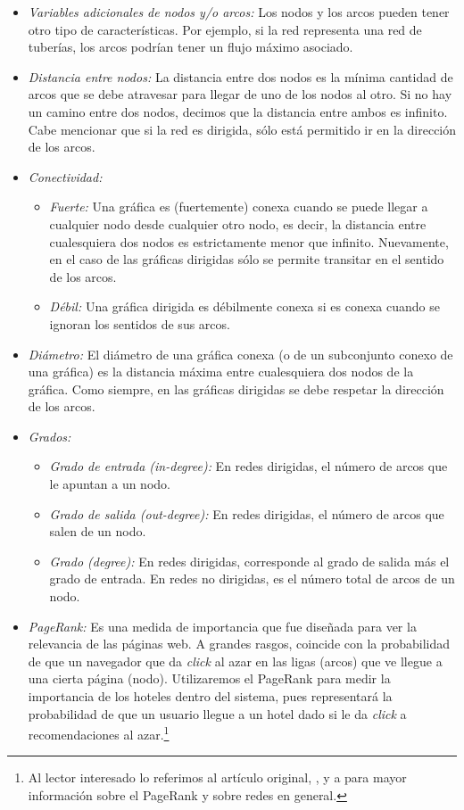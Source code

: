 \documentclass[12pt]{report}
\begin{document}
\begin{itemize}
	\item \emph{Variables adicionales de nodos y/o arcos:} Los nodos y los arcos pueden tener otro tipo de características. Por ejemplo, si la red representa una red de tuberías, los arcos podrían tener un flujo máximo asociado.
	\item \emph{Distancia entre nodos:} La distancia entre dos nodos es la mínima cantidad de arcos que se debe atravesar para llegar de uno de los nodos al otro. Si no hay un camino entre dos nodos, decimos que la distancia entre ambos es infinito. Cabe mencionar que si la red es dirigida, sólo está permitido ir en la dirección de los arcos.
	\item \emph{Conectividad:}
	\begin{itemize}
		\item \emph{Fuerte:} Una gráfica es (fuertemente) conexa cuando se puede llegar a cualquier nodo desde cualquier otro nodo, es decir, la distancia entre cualesquiera dos nodos es estrictamente menor que infinito. Nuevamente, en el caso de las gráficas dirigidas sólo se permite transitar en el sentido de los arcos.
		\item \emph{Débil:} Una gráfica dirigida es débilmente conexa si es conexa cuando se ignoran los sentidos de sus arcos.
	\end{itemize}
	\item \emph{Diámetro:} El diámetro de una gráfica conexa (o de un subconjunto conexo de una gráfica) es la distancia máxima entre cualesquiera dos nodos de la gráfica. Como siempre, en las gráficas dirigidas se debe respetar la dirección de los arcos.
	\item \emph{Grados:}
	\begin{itemize}
		\item \emph{Grado de entrada (in-degree):} En redes dirigidas, el número de arcos que le apuntan a un nodo.
		\item \emph{Grado de salida (out-degree):} En redes dirigidas, el número de arcos que salen de un nodo.
		\item \emph{Grado (degree):} En redes dirigidas, corresponde al grado de salida más el grado de entrada. En redes no dirigidas, es el número total de arcos de un nodo.
	\end{itemize}
	\item \emph{PageRank:} Es una medida de importancia que fue diseñada para ver la relevancia de las páginas web. A grandes rasgos, coincide con la probabilidad de que un navegador que da \emph{click} al azar en las ligas (arcos) que ve llegue a una cierta página (nodo). Utilizaremos el PageRank para medir la importancia de los hoteles dentro del sistema, pues representará la probabilidad de que un usuario llegue a un hotel dado si le da \emph{click} a recomendaciones al azar.\footnote{Al lector interesado lo referimos al artículo original, \cite{pagerank}, y a \cite{mmds} para mayor información sobre el PageRank y sobre redes en general.}
\end{itemize}
\end{document}
